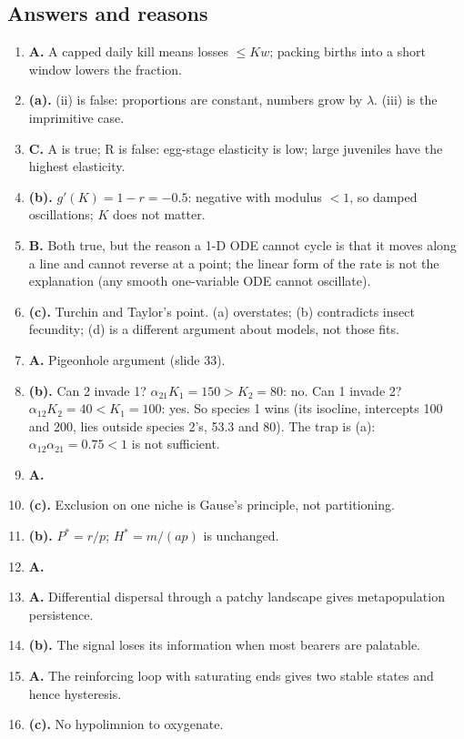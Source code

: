 \subsection*{Answers and reasons}
\begin{enumerate}[label=\textbf{Q\arabic*.},leftmargin=2.6em]
\item \textbf{A.} A capped daily kill means losses $\le Kw$; packing births into a short window lowers the fraction.
\item \textbf{(a).} (ii) is false: proportions are constant, numbers grow by $\lambda$. (iii) is the imprimitive case.
\item \textbf{C.} A is true; R is false: egg-stage elasticity is low; large juveniles have the highest elasticity.
\item \textbf{(b).} $g'(K)=1-r=-0.5$: negative with modulus $<1$, so damped oscillations; $K$ does not matter.
\item \textbf{B.} Both true, but the reason a 1-D ODE cannot cycle is that it moves along a line and cannot reverse at a point;
the linear form of the rate is not the explanation (any smooth one-variable ODE cannot oscillate).
\item \textbf{(c).} Turchin and Taylor's point. (a) overstates; (b) contradicts insect fecundity; (d) is a different argument
about models, not those fits.
\item \textbf{A.} Pigeonhole argument (slide 33).
\item \textbf{(b).} Can 2 invade 1? $\alpha_{21}K_1=150>K_2=80$: no. Can 1 invade 2? $\alpha_{12}K_2=40<K_1=100$: yes. So
species 1 wins (its isocline, intercepts 100 and 200, lies outside species 2's, 53.3 and 80). The trap is (a):
$\alpha_{12}\alpha_{21}=0.75<1$ is not sufficient.
\item \textbf{A.}
\item \textbf{(c).} Exclusion on one niche is Gause's principle, not partitioning.
\item \textbf{(b).} $P^*=r/p$; $H^*=m/(ap)$ is unchanged.
\item \textbf{A.}
\item \textbf{A.} Differential dispersal through a patchy landscape gives metapopulation persistence.
\item \textbf{(b).} The signal loses its information when most bearers are palatable.
\item \textbf{A.} The reinforcing loop with saturating ends gives two stable states and hence hysteresis.
\item \textbf{(c).} No hypolimnion to oxygenate.

\end{enumerate}
